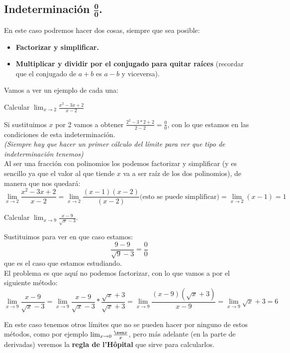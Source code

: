 \documentclass[a4paper,11pt,answers]{exam}
\begin{document}
\subsection{Indeterminación $\boldsymbol{\frac{0}{0}}$.}
En este caso podremos hacer dos cosas, siempre que sea posible:
\begin{itemize}
	\item \textbf{Factorizar y simplificar.}
	\item \textbf{Multiplicar y dividir por el conjugado para quitar raíces} (recordar que el conjugado de $a+b$ es $a-b$ y viceversa).
\end{itemize}
Vamos a ver un ejemplo de cada una:
\begin{questions}
\question Calcular $\lim_{x \to 2} \frac{x^2 - 3x + 2}{x-2}$
\begin{solution}
Si sustituimos $x$ por 2 vamos a obtener $\frac{2^2 - 3*2 + 2}{2 - 2}=
\frac{0}{0}$, con lo que estamos en las condiciones de esta indeterminación.\\
\textit{(Siempre hay que hacer un primer cálculo del límite para ver que tipo de indeterminación tenemos)}\\

Al ser una fracción con polinomios los podemos factorizar y simplificar (y es sencillo ya que el valor al que tiende $x$ va a ser raíz de los dos polinomios), de manera que nos quedará:
\[\lim_{x \to 2} \frac{x^2 - 3x + 2}{x-2} = 
\lim_{x \to 2}\frac{(x-1)(x-2)}{(x-2)} \text{(esto se puede simplificar)} = \lim_{x \to 2} (x-1) = 1\]
\end{solution}
\question Calcular $\lim_{x \to 9} \frac{x -9}{\sqrt{x} - 3}$.
\begin{solution}
Sustituimos para ver en que caso estamos:
\[\frac{9 -9}{\sqrt{9} -3} = \frac{0}{0}\]
que es el caso que estamos estudiando.\\

El problema es que aquí no podemos factorizar, con lo que vamos a por el siguiente método:
\[\lim_{x \to 9} \frac{x -9}{\sqrt{x} - 3} =
\lim_{x \to 9} \frac{x -9}{\sqrt{x} - 3}*\frac{\sqrt{x}+3}{\sqrt{x}+3}=
\lim_{x \to 9} \frac{(x -9)(\sqrt{x} +3)}{x -9} = \lim_{x \to 9}\sqrt{x}+3= 6\]
\end{solution}
\end{questions}

En este caso tenemos otros límites que no se pueden hacer por ninguno de estos métodos, como por ejemplo $\lim_{x \to 0} \frac{\sen x}{x}$, pero más adelante (en la parte de derivadas) veremos la \textbf{regla de l'Hôpital} que sirve para calcularlos.
\end{document}
